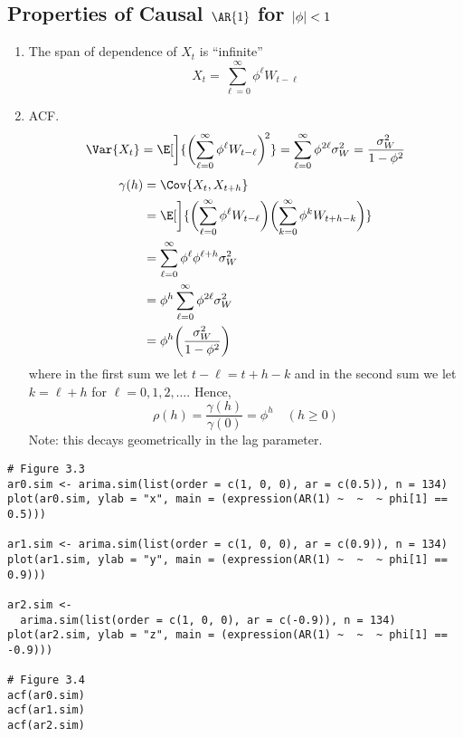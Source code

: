\subsection*{Properties of Causal $ \AR{1} $ for $ \lvert\phi\rvert<1 $}
\begin{enumerate}[(1)]
    \item The span of dependence of $ X_t $ is ``infinite''
          \[ X_t=\sum_{\ell=0}^{\infty} \phi^\ell W_{t-\ell} \]
    \item ACF.\@
          \[ \Var{X_t}=\E[\bigg]{\biggl(\sum_{\ell=0}^{\infty}\phi^\ell W_{t-\ell} \biggr)^{\!2}}
              =\sum_{\ell=0}^{\infty} \phi^{2\ell}\sigma_W^2=\frac{\sigma_W^2}{1-\phi^2}  \]
          \begin{align*}
              \gamma(h)
               & =\Cov{X_t,X_{t+h}}                                                                                                      \\
               & =\E[\bigg]{\biggl(\sum_{\ell=0}^{\infty} \phi^\ell W_{t-\ell}\biggr)\biggl(\sum_{k=0}^{\infty} \phi^k W_{t+h-k}\biggr)} \\
               & =\sum_{\ell=0}^{\infty} \phi^\ell \phi^{\ell+h}\sigma_W^2                                                               \\
               & =\phi^h \sum_{\ell=0}^{\infty} \phi^{2\ell}\sigma_W^2                                                                   \\
               & =\phi^h \biggl(\frac{\sigma_W^2}{1-\phi^2} \biggr)
          \end{align*}
          where in the first sum we let $ t-\ell=t+h-k $ and in the second sum
          we let $ k=\ell+h $ for $ \ell=0,1,2,\ldots $. Hence,
          \[ \rho(h)=\frac{\gamma(h)}{\gamma(0)} =\phi^h\quad(h\ge 0) \]
          Note: this decays geometrically in the lag parameter.
\end{enumerate}
\begin{verbatim}
# Figure 3.3
ar0.sim <- arima.sim(list(order = c(1, 0, 0), ar = c(0.5)), n = 134)
plot(ar0.sim, ylab = "x", main = (expression(AR(1) ~  ~  ~ phi[1] == 0.5)))

ar1.sim <- arima.sim(list(order = c(1, 0, 0), ar = c(0.9)), n = 134)
plot(ar1.sim, ylab = "y", main = (expression(AR(1) ~  ~  ~ phi[1] == 0.9)))

ar2.sim <-
  arima.sim(list(order = c(1, 0, 0), ar = c(-0.9)), n = 134)
plot(ar2.sim, ylab = "z", main = (expression(AR(1) ~  ~  ~ phi[1] == -0.9)))

# Figure 3.4
acf(ar0.sim)
acf(ar1.sim)
acf(ar2.sim)    
\end{verbatim}
